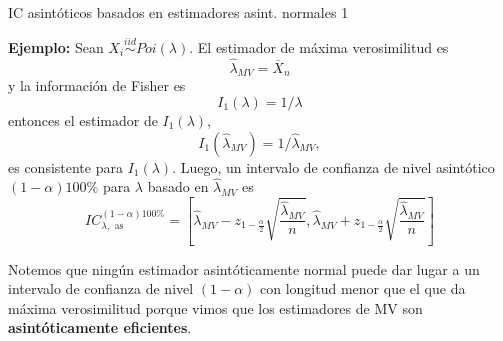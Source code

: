 \documentclass{beamer}
\theoremstyle{definition}
\begin{document}
\begin{frame}{\color{rosee}IC asint\'oticos basados en estimadores asint. normales 1}\small
  
\textbf{Ejemplo:}  Sean $X_i \stackrel{iid}{\sim} Poi(\lambda)$. El estimador de m\'axima verosimilitud es
    \[\widehat{\lambda}_{MV} = \overline{X}_{n}\]
    y la informaci\'on de Fisher es
    \[I_1(\lambda) = 1/\lambda\]
    entonces el estimador de $I_1(\lambda)$,
    \[I_1(\widehat{\lambda}_{MV}) = 1/\widehat{\lambda}_{MV},\]
    es consistente para $I_1(\lambda)$.
    Luego, un intervalo de confianza de nivel asintótico $(1-\alpha)100\%$ para $\lambda$ basado en $\widehat{\lambda}_{MV}$ es
    \[IC_{\lambda,\text{ as}}^{(1-\alpha)100\%}=\left[\widehat{\lambda}_{MV} - z_{1-\frac{\alpha}{2}} \sqrt{\frac{\widehat{\lambda}_{MV}}{n}},\widehat{\lambda}_{MV} + z_{1-\frac{\alpha}{2}} \sqrt{\frac{\widehat{\lambda}_{MV}}{n}}\right]\]

  
Notemos que ningún estimador asintóticamente normal puede dar lugar a un intervalo de confianza de nivel $(1-\alpha)$ con longitud menor que el que da máxima verosimilitud porque vimos que los estimadores de MV son \textbf{asintóticamente eficientes}.


\end{frame}
\end{document}
